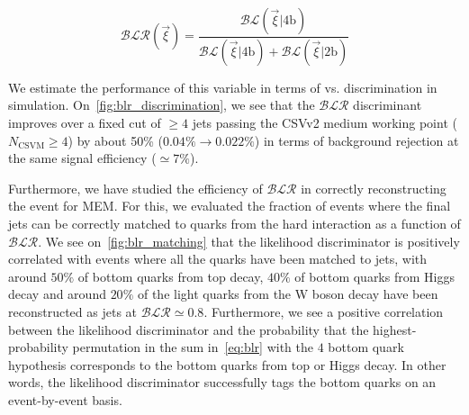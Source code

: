\begin{equation}
\label{eq:blr_ratio}
\mathcal{BLR}(\vec{\xi}) = \frac{\mathcal{BL}(\vec{\xi} | 4\mathrm{b})}{\mathcal{BL}(\vec{\xi} | 4\mathrm{b}) + \mathcal{BL}(\vec{\xi} | 2\mathrm{b})}
\end{equation}

We estimate the performance of this variable in terms of \ttHbb vs. \ttlf discrimination in simulation. On~\cref{fig:blr_discrimination}, we see that the $\mathcal{BLR}$ discriminant improves over a fixed cut of $\ge4$ jets passing the CSVv2 medium working point ($N_{\mathrm{CSVM}} \ge 4$) by about 50\% ($0.04\% \rightarrow 0.022\%$) in terms of background rejection at the same signal efficiency ($\simeq 7\%$).

Furthermore, we have studied the efficiency of $\mathcal{BLR}$ in correctly reconstructing the event for MEM. For this, we evaluated the fraction of events where the final jets can be correctly matched to quarks from the hard interaction as a function of $\mathcal{BLR}$. We see on~\cref{fig:blr_matching} that the likelihood discriminator is positively correlated with events where all the quarks have been matched to jets, with around $50\%$ of bottom quarks from top decay, $40\%$ of bottom quarks from Higgs decay and around $20\%$ of the light quarks from the W boson decay have been reconstructed as jets at $\mathcal{BLR} \simeq 0.8$. Furthermore, we see a positive correlation between the likelihood discriminator and the probability that the highest-probability permutation in the sum in~\cref{eq:blr} with the $4$ bottom quark hypothesis corresponds to the bottom quarks from top or Higgs decay. In other words, the likelihood discriminator successfully tags the bottom quarks on an event-by-event basis.

